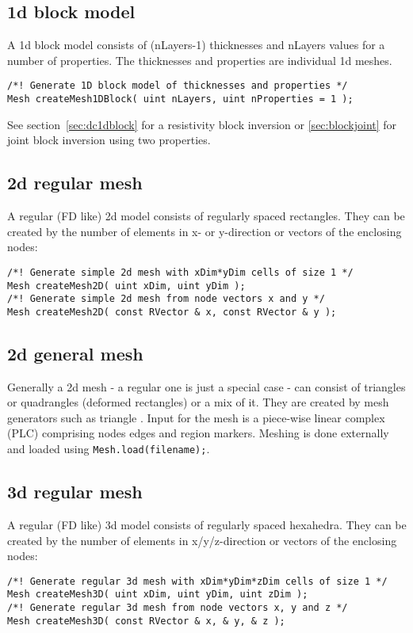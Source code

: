 \subsection*{1d block model}
A 1d block model consists of (nLayers-1) thicknesses and nLayers values for a number of properties.
The thicknesses and properties are individual 1d meshes.
\begin{lstlisting}
/*! Generate 1D block model of thicknesses and properties */
Mesh createMesh1DBlock( uint nLayers, uint nProperties = 1 );
\end{lstlisting}
See section~\ref{sec:dc1dblock} for a resistivity block inversion or \ref{sec:blockjoint} for joint block inversion using two properties.

\subsection*{2d regular mesh}
A regular (FD like) 2d model consists of regularly spaced rectangles.
They can be created by the number of elements in x- or y-direction or vectors of the enclosing nodes:
\begin{lstlisting}
/*! Generate simple 2d mesh with xDim*yDim cells of size 1 */
Mesh createMesh2D( uint xDim, uint yDim );
/*! Generate simple 2d mesh from node vectors x and y */
Mesh createMesh2D( const RVector & x, const RVector & y );
\end{lstlisting}

\subsection*{2d general mesh}
Generally a 2d mesh - a regular one is just a special case - can consist of triangles or quadrangles (deformed rectangles) or a mix of it. 
They are created by mesh generators such as triangle \citep{triangle}.
Input for the mesh is a piece-wise linear complex (PLC) comprising nodes edges and region markers.
Meshing is done externally and loaded using \lstinline|Mesh.load(filename);|.

\subsection*{3d regular mesh}
A regular (FD like) 3d model consists of regularly spaced hexahedra.
They can be created by the number of elements in x/y/z-direction or vectors of the enclosing nodes:
\begin{lstlisting}
/*! Generate regular 3d mesh with xDim*yDim*zDim cells of size 1 */
Mesh createMesh3D( uint xDim, uint yDim, uint zDim );
/*! Generate regular 3d mesh from node vectors x, y and z */
Mesh createMesh3D( const RVector & x, & y, & z );
\end{lstlisting}

